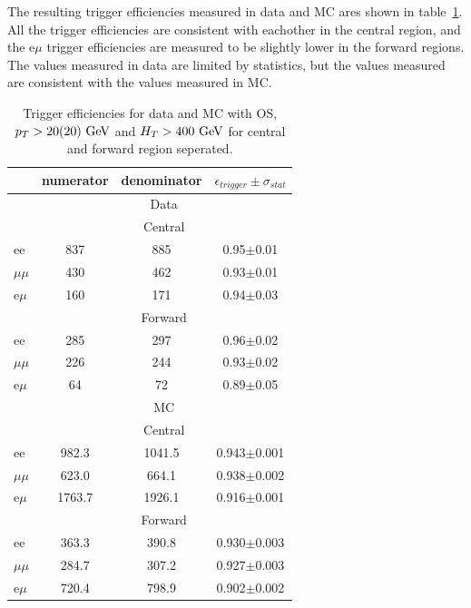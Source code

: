 The resulting trigger efficiencies measured in data and MC ares shown in table~\ref{tab:EffValues_Seperated}.
All the trigger efficiencies are consistent with eachother in the central region,
and the e$\mu$ trigger efficiencies are measured to be slightly lower in the forward regions.
The values measured in data are limited by statistics, but the values measured are consistent with the values measured in MC.

\begin{table}[hbp]
  \begin{center}
  \caption{
    Trigger efficiencies for data and MC with OS, $p_T>20(20)\,\,\text{Ge\hspace{-.08em}V}$
    and $H_T>400\,\,\text{Ge\hspace{-.08em}V}$ for central and forward region seperated.
  } 
  \begin{tabular}{l|c|c|c}     
    & numerator & denominator & $\epsilon_{trigger} \pm \sigma_{stat}$  \\ 
    \hline
    &\multicolumn{3}{c}{Data} \\
    \hline
    &  \multicolumn{3}{|c}{ Central } \\
    \hline
    ee       & 837 & 885 & 0.95$\pm$0.01  \\
    $\mu\mu$ & 430 & 462 & 0.93$\pm$0.01  \\
    e$\mu$   & 160 & 171 & 0.94$\pm$0.03  \\        
    \hline 
    &  \multicolumn{3}{|c}{ Forward } \\
    \hline
    ee       & 285 & 297 & 0.96$\pm$0.02  \\
    $\mu\mu$ & 226 & 244 & 0.93$\pm$0.02  \\
    e$\mu$   &  64 &  72 & 0.89$\pm$0.05  \\
    \hline
    \hline
    & \multicolumn{3}{c}{MC} \\
    \hline
    & \multicolumn{3}{|c}{ Central } \\
    \hline 
    ee       &  982.3 & 1041.5 & 0.943$\pm$0.001 \\
    $\mu\mu$ &  623.0 &  664.1 & 0.938$\pm$0.002 \\
    e$\mu$   & 1763.7 & 1926.1 & 0.916$\pm$0.001 \\    
    \hline 
    & \multicolumn{3}{|c}{ Forward } \\
    \hline 
    ee       &  363.3 & 390.8 & 0.930$\pm$0.003 \\
    $\mu\mu$ &  284.7 & 307.2 & 0.927$\pm$0.003 \\
    e$\mu$   &  720.4 & 798.9 & 0.902$\pm$0.002 \\    
    \hline 
    \hline
  \end{tabular}  
  \label{tab:EffValues_Seperated}
  \end{center}
\end{table}	

